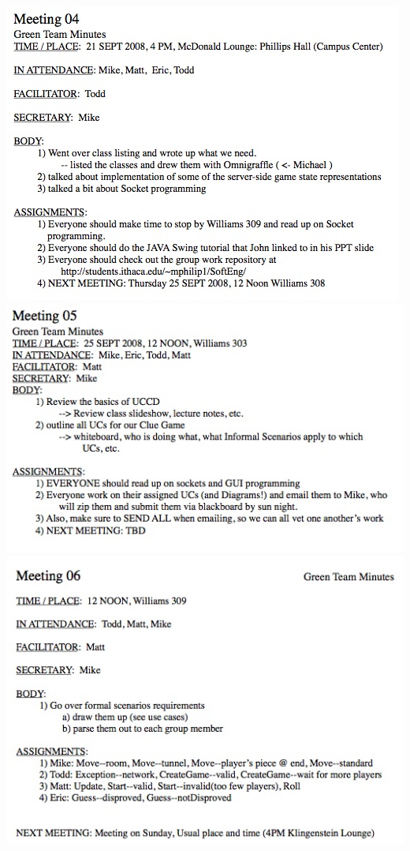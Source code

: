 \begin{flushleft}
	\newpage
	\includegraphics[scale=0.75]{../DesignDocumentation/Minutes/Minutes_04.jpg}
	\newpage
	\includegraphics[scale=0.75]{../DesignDocumentation/Minutes/Minutes_05.jpg}
	\newpage
	\includegraphics[scale=0.75]{../DesignDocumentation/Minutes/Minutes_06.jpg}

\end{flushleft}
